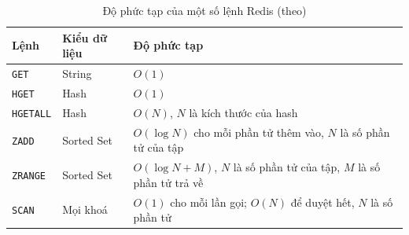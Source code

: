 \begin{table}[H]
    \centering
    \caption{Độ phức tạp của một số lệnh Redis (theo)}
    \label{tab:redis-complexity}
    \begin{tabularx}{\textwidth}{>{\raggedright\arraybackslash}p{2.6cm} >{\raggedright\arraybackslash}p{2.4cm} X}
        \toprule
        \textbf{Lệnh} & \textbf{Kiểu dữ liệu} & \textbf{Độ phức tạp} \\
        \midrule
        \texttt{GET} & String & $O(1)$ \\
        \texttt{HGET} & Hash & $O(1)$ \\
        \texttt{HGETALL} & Hash & $O(N)$, $N$ là kích thước của hash \\
        \texttt{ZADD} & Sorted Set & $O(\log N)$ cho mỗi phần tử thêm vào, $N$ là số phần tử của tập \\
        \texttt{ZRANGE} & Sorted Set & $O(\log N + M)$, $N$ là số phần tử của tập, $M$ là số phần tử trả về \\
        \texttt{SCAN} & Mọi khoá & $O(1)$ cho mỗi lần gọi; $O(N)$ để duyệt hết, $N$ là số phần tử \\
        \bottomrule
    \end{tabularx}
\end{table}

